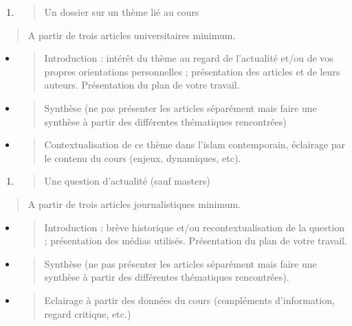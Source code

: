\begin{enumerate}
\def\labelenumi{\alph{enumi}.}
\item
  \begin{quote}
  {Un dossier sur un thème lié au cours}
  \end{quote}
\end{enumerate}

\begin{quote}
A partir de trois articles universitaires minimum.
\end{quote}

\begin{itemize}
\item
  \begin{quote}
  Introduction : intérêt du thème au regard de l'actualité et/ou de vos
  propres orientations personnelles ; présentation des articles et de
  leurs auteurs. Présentation du plan de votre travail.
  \end{quote}
\item
  \begin{quote}
  Synthèse (ne pas présenter les articles séparément mais faire une
  synthèse à partir des différentes thématiques rencontrées)
  \end{quote}
\item
  \begin{quote}
  Contextualisation de ce thème dans l'islam contemporain, éclairage par
  le contenu du cours (enjeux, dynamiques, etc).
  \end{quote}
\end{itemize}

\begin{enumerate}
\def\labelenumi{\alph{enumi}.}
\setcounter{enumi}{1}
\item
  \begin{quote}
  {Une question d'actualité} (sauf masters)
  \end{quote}
\end{enumerate}

\begin{quote}
A partir de trois articles journalistiques minimum.
\end{quote}

\begin{itemize}
\item
  \begin{quote}
  Introduction : brève historique et/ou recontextualisation de la
  question ; présentation des médias utilisés. Présentation du plan de
  votre travail.
  \end{quote}
\item
  \begin{quote}
  Synthèse (ne pas présenter les articles séparément mais faire une
  synthèse à partir des différentes thématiques rencontrées).
  \end{quote}
\item
  \begin{quote}
  Eclairage à partir des données du cours (compléments d'information,
  regard critique, etc.)
  \end{quote}
\end{itemize}

